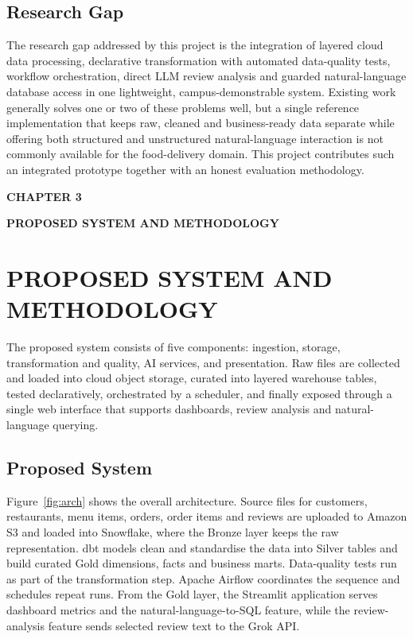 \documentclass[12pt,a4paper]{report}
\newcommand{\chaptersplit}[2]{%
  \clearpage
  \thispagestyle{empty}%
  \vspace*{\fill}
  \begin{center}
    {\fontsize{16}{20}\selectfont\bfseries CHAPTER #1\par}
    \vspace{1.2cm}
    {\fontsize{16}{20}\selectfont\bfseries #2\par}
  \end{center}
  \vspace*{\fill}
  \clearpage
}
\begin{document}
\section{Research Gap}
The research gap addressed by this project is the integration of layered cloud data processing, declarative transformation with automated data-quality tests, workflow orchestration, direct LLM review analysis and guarded natural-language database access in one lightweight, campus-demonstrable system. Existing work generally solves one or two of these problems well, but a single reference implementation that keeps raw, cleaned and business-ready data separate while offering both structured and unstructured natural-language interaction is not commonly available for the food-delivery domain. This project contributes such an integrated prototype together with an honest evaluation methodology.

\chaptersplit{3}{PROPOSED SYSTEM AND METHODOLOGY}

\chapter{PROPOSED SYSTEM AND METHODOLOGY}

\noindent The proposed system consists of five components: ingestion, storage, transformation and quality, AI services, and presentation. Raw files are collected and loaded into cloud object storage, curated into layered warehouse tables, tested declaratively, orchestrated by a scheduler, and finally exposed through a single web interface that supports dashboards, review analysis and natural-language querying.

\section{Proposed System}
Figure~\ref{fig:arch} shows the overall architecture. Source files for customers, restaurants, menu items, orders, order items and reviews are uploaded to Amazon S3 and loaded into Snowflake, where the Bronze layer keeps the raw representation. dbt models clean and standardise the data into Silver tables and build curated Gold dimensions, facts and business marts. Data-quality tests run as part of the transformation step. Apache Airflow coordinates the sequence and schedules repeat runs. From the Gold layer, the Streamlit application serves dashboard metrics and the natural-language-to-SQL feature, while the review-analysis feature sends selected review text to the Grok API.
\end{document}
